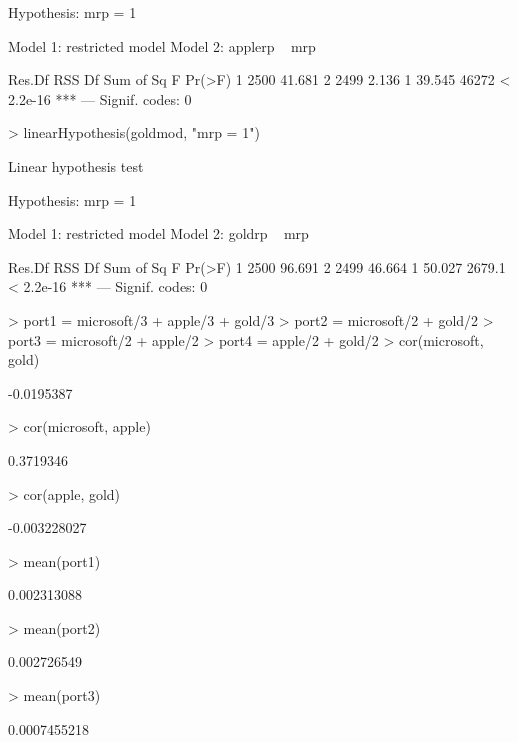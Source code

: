 \documentclass[12pt, a14paper, lithuanian]{article}
\begin{document}
\begin{Schunk}
\begin{Soutput}
Hypothesis:
mrp = 1

Model 1: restricted model
Model 2: applerp ~ mrp

  Res.Df    RSS Df Sum of Sq     F    Pr(>F)    
1   2500 41.681                                 
2   2499  2.136  1    39.545 46272 < 2.2e-16 ***
---
Signif. codes:  0 
\end{Soutput}
\begin{Sinput}
> linearHypothesis(goldmod, "mrp = 1")
\end{Sinput}
\begin{Soutput}
Linear hypothesis test

Hypothesis:
mrp = 1

Model 1: restricted model
Model 2: goldrp ~ mrp

  Res.Df    RSS Df Sum of Sq      F    Pr(>F)    
1   2500 96.691                                  
2   2499 46.664  1    50.027 2679.1 < 2.2e-16 ***
---
Signif. codes:  0 
\end{Soutput}
\begin{Sinput}
> port1 = microsoft/3 + apple/3 + gold/3
> port2 = microsoft/2 + gold/2
> port3 = microsoft/2 + apple/2
> port4 = apple/2 + gold/2
> cor(microsoft, gold)
\end{Sinput}
\begin{Soutput}
[1] -0.0195387
\end{Soutput}
\begin{Sinput}
> cor(microsoft, apple)
\end{Sinput}
\begin{Soutput}
[1] 0.3719346
\end{Soutput}
\begin{Sinput}
> cor(apple, gold)
\end{Sinput}
\begin{Soutput}
[1] -0.003228027
\end{Soutput}
\begin{Sinput}
> mean(port1)
\end{Sinput}
\begin{Soutput}
[1] 0.002313088
\end{Soutput}
\begin{Sinput}
> mean(port2)
\end{Sinput}
\begin{Soutput}
[1] 0.002726549
\end{Soutput}
\begin{Sinput}
> mean(port3)
\end{Sinput}
\begin{Soutput}
[1] 0.0007455218

\end{Soutput}
\end{Schunk}
\end{document}
